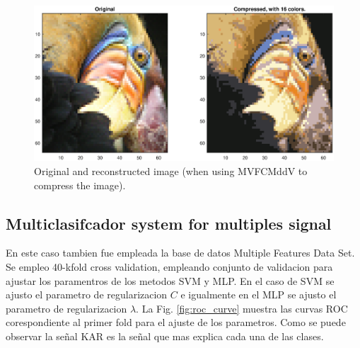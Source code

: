 \documentclass[12pt]{article}
\begin{document}
\begin{figure}[h]
\centering
\includegraphics[width=5.5in]{../out/image-compress-16.eps}
\caption{Original and reconstructed image (when using MVFCMddV to compress the image).}
\label{fig:image_compress}
\end{figure}  


\subsection{Multiclasifcador system for multiples signal}

En este caso tambien fue empleada la base de datos Multiple Features Data Set. Se empleo 40-kfold cross validation, empleando conjunto de validacion para ajustar los paramentros de los metodos SVM y MLP. En el caso de SVM se ajusto el parametro de regularizacion $C$ e igualmente en el MLP se ajusto el parametro de regularizacion $\lambda$. La Fig. \ref{fig:roc_curve} muestra las curvas ROC corespondiente al primer fold para el ajuste de los parametros. Como se puede observar la señal KAR es la señal que mas explica cada una de las clases. 
\end{document}
